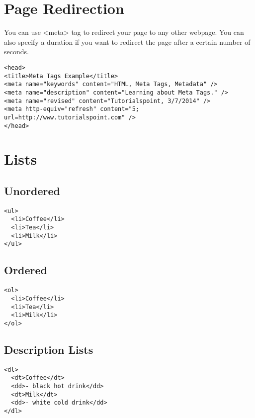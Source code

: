 \documentclass{report}
\begin{document}
    \bigbreak \noindent 
    \section{\LARGE Page Redirection}
    \bigbreak \noindent 
    You can use <meta> tag to redirect your page to any other webpage. You can also specify a
duration if you want to redirect the page after a certain number of seconds.
\bigbreak \noindent 
\sepline
\begin{verbatim}
<head>
<title>Meta Tags Example</title>
<meta name="keywords" content="HTML, Meta Tags, Metadata" />
<meta name="description" content="Learning about Meta Tags." />
<meta name="revised" content="Tutorialspoint, 3/7/2014" />
<meta http-equiv="refresh" content="5; url=http://www.tutorialspoint.com" />
</head>
\end{verbatim}
\sepline

    \pagebreak \bigbreak \noindent 
    \section{\LARGE Lists}
    \bigbreak \noindent 
    \subsection{Unordered}
    \bigbreak \noindent 
    \sepline
    \begin{verbatim}
<ul>
  <li>Coffee</li>
  <li>Tea</li>
  <li>Milk</li>
</ul>
    \end{verbatim}
    \sepline

    \bigbreak \noindent 
    \subsection{Ordered}
    \bigbreak \noindent 
    \sepline
    \begin{verbatim}
<ol>
  <li>Coffee</li>
  <li>Tea</li>
  <li>Milk</li>
</ol>
    \end{verbatim}
    \sepline
    \bigbreak \noindent 
    \subsection{Description Lists}
    \bigbreak \noindent 
    \sepline
    \begin{verbatim}
<dl>
  <dt>Coffee</dt>
  <dd>- black hot drink</dd>
  <dt>Milk</dt>
  <dd>- white cold drink</dd>
</dl>
    \end{verbatim}
    \sepline
\end{document}
